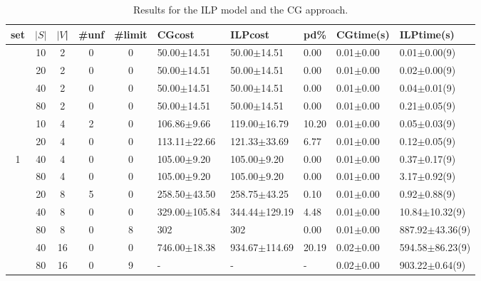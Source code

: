 \documentclass[12pt]{article}
\begin{document}
\begin{table}[h]
\begin{center}
\scriptsize
  \caption{Results for the ILP model and the CG approach. \label{tab:com1}}
  \begin{tabular}{c c c| c c l l l l l}
set &$|S|$ & $|V$| &  \#unf & \#limit & CGcost           &   ILPcost   &  pd\%   &  CGtime(s)        &  ILPtime(s)    \\
\hline
&10 & 2    & 0 & 0 &  50.00$\pm$14.51       &  50.00$\pm$14.51    &   0.00     &  0.01$\pm$0.00   &  0.01$\pm$0.00(9)        \\
&20 & 2    & 0 & 0 &  50.00$\pm$14.51       &  50.00$\pm$14.51    &   0.00     &  0.01$\pm$0.00   &  0.02$\pm$0.00(9)        \\
&40 & 2    & 0 & 0 &  50.00$\pm$14.51       &  50.00$\pm$14.51    &   0.00     &  0.01$\pm$0.00   &  0.04$\pm$0.01(9)        \\
&80 & 2    & 0 & 0 &  50.00$\pm$14.51       &  50.00$\pm$14.51    &   0.00     &  0.01$\pm$0.00   &  0.21$\pm$0.05(9)        \\
&10 & 4    & 2 & 0 &  106.86$\pm$9.66       &  119.00$\pm$16.79   &   10.20    &  0.01$\pm$0.00   &  0.05$\pm$0.03(9)        \\
&20 & 4    & 0 & 0 &  113.11$\pm$22.66      &  121.33$\pm$33.69   &   6.77     &  0.01$\pm$0.00   &  0.12$\pm$0.05(9)        \\
1&40 & 4   & 0 & 0 &  105.00$\pm$9.20       &  105.00$\pm$9.20     &  0.00     &  0.01$\pm$0.00   &  0.37$\pm$0.17(9)        \\
&80 & 4    & 0 & 0 &  105.00$\pm$9.20       &  105.00$\pm$9.20    &   0.00     &  0.01$\pm$0.00   &  3.17$\pm$0.92(9)        \\
&20 & 8    & 5 & 0 &  258.50$\pm$43.50      &  258.75$\pm$43.25   &   0.10     &  0.01$\pm$0.00   &  0.92$\pm$0.88(9)        \\
&40 & 8    & 0 & 0 &  329.00$\pm$105.84     &  344.44$\pm$129.19  &   4.48     &  0.01$\pm$0.00   &  10.84$\pm$10.32(9)      \\
&80 & 8    & 0 & 8 &  302                   &  302                &   0.00     &  0.01$\pm$0.00   &  887.92$\pm$43.36(9)     \\
&40 & 16   & 0 & 0 &  746.00$\pm$18.38      &  934.67$\pm$114.69  &   20.19    &  0.02$\pm$0.00   &  594.58$\pm$86.23(9)    \\
&80 & 16   & 0 & 9 &  -                     &  -                  &   -        &  0.02$\pm$0.00   &  903.22$\pm$0.64(9)      \\

\end{tabular}
\end{center}
\end{table}
\end{document}
